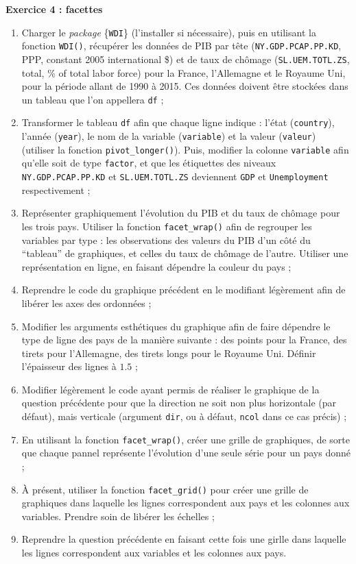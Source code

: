 \documentclass[
  11pt,
]{book}
\makeatletter
\numberwithin{equation}{section}
\numberwithin{countremarque}{section}
\newenvironment{exframe}{%
 \def\at@end@of@exframe{}%
 \ifinner\ifhmode%
  \def\at@end@of@exframe{\end{minipage}}%
  \begin{minipage}{\columnwidth}%
 \fi\fi%
 \def\FrameCommand##1{\hskip\@totalleftmargin \hskip-\fboxsep
 \colorbox{shadecolorex}{##1}\hskip-\fboxsep
     \hskip-\linewidth \hskip-\@totalleftmargin \hskip\columnwidth}%
 \MakeFramed {\advance\hsize-\width
   \@totalleftmargin\z@ \linewidth\hsize
   \@setminipage}}%
 {\par\unskip\endMakeFramed%
 \at@end@of@exframe}
\makeatother
\begin{document}
\begin{exframe}
\textbf{Exercice 4 : facettes}

\begin{enumerate}
\def\labelenumi{\arabic{enumi}.}
\item
  Charger le \emph{package} \{\texttt{WDI}\} (l'installer si nécessaire), puis en utilisant la fonction \texttt{WDI()}, récupérer les données de PIB par tête (\texttt{NY.GDP.PCAP.PP.KD}, PPP, constant 2005 international \$) et de taux de chômage (\texttt{SL.UEM.TOTL.ZS}, total, \% of total labor force) pour la France, l'Allemagne et le Royaume Uni, pour la période allant de 1990 à 2015. Ces données doivent être stockées dans un tableau que l'on appellera \texttt{df} ;
\item
  Transformer le tableau \texttt{df} afin que chaque ligne indique : l'état (\texttt{country}), l'année (\texttt{year}), le nom de la variable (\texttt{variable}) et la valeur (\texttt{valeur}) (utiliser la fonction \texttt{pivot\_longer()}). Puis, modifier la colonne \texttt{variable} afin qu'elle soit de type \texttt{factor}, et que les étiquettes des niveaux \texttt{NY.GDP.PCAP.PP.KD} et \texttt{SL.UEM.TOTL.ZS} deviennent \texttt{GDP} et \texttt{Unemployment} respectivement ;
\item
  Représenter graphiquement l'évolution du PIB et du taux de chômage pour les trois pays. Utiliser la fonction \texttt{facet\_wrap()} afin de regrouper les variables par type : les observations des valeurs du PIB d'un côté du ``tableau'' de graphiques, et celles du taux de chômage de l'autre. Utiliser une représentation en ligne, en faisant dépendre la couleur du pays ;
\item
  Reprendre le code du graphique précédent en le modifiant légèrement afin de libérer les axes des ordonnées ;
\item
  Modifier les arguments esthétiques du graphique afin de faire dépendre le type de ligne des pays de la manière suivante : des points pour la France, des tirets pour l'Allemagne, des tirets longs pour le Royaume Uni. Définir l'épaisseur des lignes à \(1.5\) ;
\item
  Modifier légèrement le code ayant permis de réaliser le graphique de la question précédente pour que la direction ne soit non plus horizontale (par défaut), mais verticale (argument \texttt{dir}, ou à défaut, \texttt{ncol} dans ce cas précis) ;
\item
  En utilisant la fonction \texttt{facet\_wrap()}, créer une grille de graphiques, de sorte que chaque pannel représente l'évolution d'une seule série pour un pays donné ;
\item
  À présent, utiliser la fonction \texttt{facet\_grid()} pour créer une grille de graphiques dans laquelle les lignes correspondent aux pays et les colonnes aux variables. Prendre soin de libérer les échelles ;
\item
  Reprendre la question précédente en faisant cette fois une girlle dans laquelle les lignes correspondent aux variables et les colonnes aux pays.
\end{enumerate}
\end{exframe}
\end{document}

